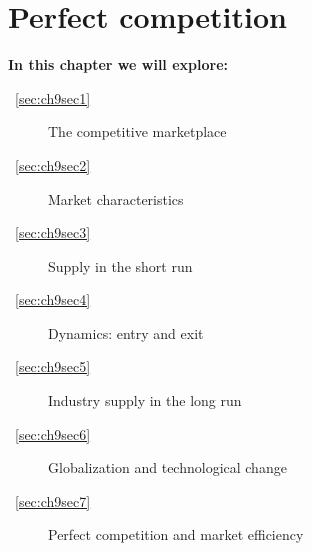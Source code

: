 \chapter{Perfect competition} \label{chap:perfectcompetition}

\begin{topics}
\textbf{In this chapter we will explore:}
\begin{description}
\item [~\ref{sec:ch9sec1}] The competitive marketplace
\item [~\ref{sec:ch9sec2}] Market characteristics
\item [~\ref{sec:ch9sec3}] Supply in the short run
\item [~\ref{sec:ch9sec4}] Dynamics: entry and exit
\item [~\ref{sec:ch9sec5}] Industry supply in the long run
\item [~\ref{sec:ch9sec6}] Globalization and technological change
\item [~\ref{sec:ch9sec7}] Perfect competition and market efficiency
\end{description}
\end{topics}